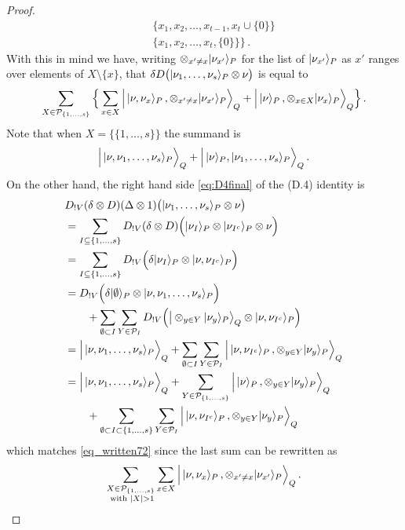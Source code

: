 \documentclass[english,letter paper,12pt,reqno]{article}
\DeclarePairedDelimiter\ket{\lvert}{\rangle}
\theoremstyle{example}
\def\be{\begin{equation}}
\def\ee{\end{equation}}
\begin{document}
\begin{proof}
\begin{align*}
&\quad\{ x_1, x_2, \ldots, x_{t-1}, x_t \cup \{0\} \}\\
&\quad\{ x_1, x_2, \ldots, x_t, \{0\} \} \Big\}\,.
\end{align*}
With this in mind we have, writing $\otimes_{x' \neq x} \ket{\nu_{x'}}_P$ for the list of $\ket{\nu_{x'}}_P$ as $x'$ ranges over elements of $X \setminus \{x\}$, that $\delta D\big(  \ket{\nu_1,\ldots,\nu_s}_P \otimes \nu \big)$ is equal to
\be\label{eq_written72}
\sum_{X \in \cat{P}_{\{1,\ldots,s\}}} \Big\{ \sum_{x \in X} \Big|\, \ket{\nu, \nu_x}_P\,, \otimes_{x' \neq x} \ket{\nu_{x'}}_P\Big\rangle_Q + \Big|\, \ket{\nu}_P\,, \otimes_{x \in X} \ket{\nu_x}_P \Big\rangle_Q \Big\}\,.
\ee
Note that when $X = \big\{ \{ 1,\ldots,s \} \big\}$ the summand is
\[
\Big|\, \ket{\nu,\nu_1,\ldots,\nu_s}_P \Big\rangle_Q + \Big|\, \ket{\nu}_P, \ket{\nu_1,\ldots,\nu_s}_P \Big\rangle_Q\,.
\]
On the other hand, the right hand side \eqref{eq:D4final} of the (D.4) identity is
\begin{align*}
&D_{{!} V}(\delta \otimes D)(\Delta \otimes 1)\big(  \ket{\nu_1,\ldots,\nu_s}_P \otimes \nu \big)\\
&= \sum_{I \subseteq \{1,\ldots,s\}} D_{{!}V}(\delta \otimes D)\Big( \ket{\nu_I}_P \otimes \ket{\nu_{I^c}}_P \otimes \nu \Big)\\
&= \sum_{I \subseteq \{1,\ldots,s\}} D_{{!} V}\Big( \delta \ket{\nu_I}_P \otimes \ket{\nu, \nu_{I^c}}_P \Big)\\
&= D_{{!} V}\Big( \delta\ket{\emptyset}_P \otimes \ket{\nu, \nu_1, \ldots, \nu_s }_P \Big)\\
&\qquad + \sum_{\emptyset \subset I} \sum_{Y \in \cat{P}_I} D_{{!}V}\Big( \big| \otimes_{y \in Y} \ket{\nu_y}_P \big\rangle_Q \otimes \ket{\nu, \nu_{I^c}}_P \Big)\\
&= \Big|\, \ket{ \nu, \nu_1,\ldots,\nu_s }_P \Big\rangle_Q + \sum_{\emptyset \subset I}\sum_{Y \in \cat{P}_I}  \Big|\, \ket{\nu, \nu_{I^c}}_P\,, \otimes_{y \in Y} \ket{\nu_y}_P \Big\rangle_Q\\
&= \Big|\, \ket{ \nu, \nu_1,\ldots,\nu_s }_P \Big\rangle_Q + \sum_{Y \in \cat{P}_{\{1,\ldots,s\}}} \Big|\, \ket{\nu}_P\,, \otimes_{y \in Y} \ket{\nu_y}_P \Big\rangle_Q\\
&\qquad+ \sum_{\emptyset \subset I \subset \{1,\ldots,s\}} \sum_{Y \in \cat{P}_I} \Big|\, \ket{\nu, \nu_{I^c}}_P\,, \otimes_{y \in Y} \ket{\nu_y}_P \Big\rangle_Q
\end{align*}
which matches \eqref{eq_written72} since the last sum can be rewritten as
\[
\sum_{\substack{X \in \cat{P}_{\{1,\ldots,s\}}\\ \text{ with } |X| > 1}} \sum_{x \in X} \Big|\, \ket{\nu, \nu_x}_P\,, \otimes_{x' \neq x} \ket{\nu_{x'}}_P \Big\rangle_Q\,.
\]
\end{proof}
\end{document}
